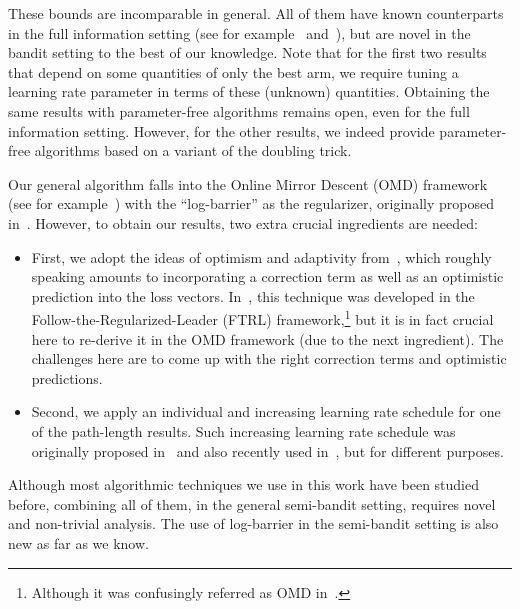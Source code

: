 These bounds are incomparable in general. 
All of them have known counterparts in the full information setting (see for example~\citep{steinhardt2014adaptivity} and~\citep{de2014follow}),
but are novel in the bandit setting to the best of our knowledge.
Note that for the first two results that depend on some quantities of only the best arm, 
we require tuning a learning rate parameter in terms of these (unknown) quantities.
Obtaining the same results with parameter-free algorithms remains open, even for the full information setting.
However, for the other results, we indeed provide parameter-free algorithms based on a variant of the doubling trick.

Our general algorithm falls into the Online Mirror Descent (OMD) framework (see for example~\citep{hazan2016introduction})
with the ``log-barrier'' as the regularizer, originally proposed in~\citep{foster2016learning}.
However, to obtain our results, two extra crucial ingredients are needed:
\begin{itemize}
\item
First, we adopt the ideas of optimism and adaptivity from~\citep{steinhardt2014adaptivity},
which roughly speaking amounts to incorporating a correction term as well as an optimistic prediction into the loss vectors.
In~\citep{steinhardt2014adaptivity}, this technique was developed in the Follow-the-Regularized-Leader (FTRL) framework,\footnote{%
Although it was confusingly referred as OMD in~\citep{steinhardt2014adaptivity}.}
but it is in fact crucial here to re-derive it in the OMD framework (due to the next ingredient).
The challenges here are to come up with the right correction terms and optimistic predictions.

\item
Second, we apply an individual and increasing learning rate schedule for one of the path-length results.
Such increasing learning rate schedule was originally proposed in~\citep{bubeck2016kernel} and also recently used in~\citep{agarwal2017corralling},
but for different purposes.

\end{itemize}

Although most algorithmic techniques we use in this work have been studied before,
combining all of them, in the general semi-bandit setting, requires novel and non-trivial analysis.
The use of log-barrier in the semi-bandit setting is also new as far as we know.

